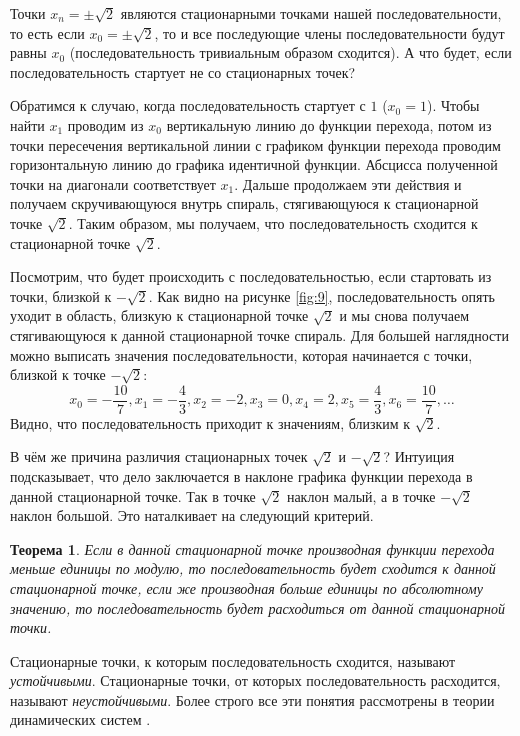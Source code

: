 \documentclass[12pt]{article}
\newtheorem{theorem}{Теорема}[section]
\begin{document}
Точки $x_n = \pm \sqrt{2}$ являются стационарными точками нашей последовательности, то есть если $x_0 = \pm\sqrt{2}$, то и все последующие члены последовательности будут равны $x_0$ (последовательность тривиальным образом сходится). А что будет, если последовательность стартует не со стационарных точек?
\par
Обратимся к случаю, когда последовательность стартует с $1$ ($x_0=1$). Чтобы найти $x_1$ проводим из $x_0$ вертикальную линию до функции перехода, потом из точки пересечения вертикальной линии с графиком функции перехода проводим горизонтальную линию до графика идентичной функции. Абсцисса полученной точки на диагонали соответствует $x_1$. Дальше продолжаем эти действия и получаем скручивающуюся внутрь спираль, стягивающуюся к стационарной точке $\sqrt{2}$. Таким образом, мы получаем, что последовательность сходится к стационарной точке $\sqrt{2}$.
\par
Посмотрим, что будет происходить с последовательностью, если стартовать из точки, близкой к $-\sqrt{2}$. Как видно на рисунке \ref{fig:9}, последовательность опять уходит в область, близкую к стационарной точке $\sqrt{2}$ и мы снова получаем стягивающуюся к данной стационарной точке спираль. Для большей наглядности можно выписать значения последовательности, которая начинается с точки, близкой к точке $-\sqrt{2}$:
\begin{equation}
    x_0 = -\dfrac{10}{7}, x_1 = - \dfrac{4}{3}, x_2 = -2, x_3 = 0, x_4 = 2, x_5 = \dfrac{4}{3}, x_6 = \dfrac{10}{7}, \ldots
\end{equation}
Видно, что последовательность приходит к значениям, близким к $\sqrt{2}$.
\par
В чём же причина различия стационарных точек $\sqrt{2}$ и $-\sqrt{2}$? Интуиция подсказывает, что дело заключается в наклоне графика функции перехода в данной стационарной точке. Так в точке $\sqrt{2}$ наклон малый, а в точке $-\sqrt{2}$ наклон большой. Это наталкивает на следующий критерий.
\begin{theorem}
Если в данной стационарной точке производная \cite{dif} функции перехода меньше единицы по модулю, то последовательность будет сходится к данной стационарной точке, если же производная больше единицы по абсолютному значению, то последовательность будет расходиться от данной стационарной точки.
\end{theorem}
Стационарные точки, к которым последовательность сходится, называют \emph{устойчивыми}. Стационарные точки, от которых последовательность расходится, называют \emph{неустойчивыми}. Более строго все эти понятия рассмотрены в теории динамических систем \cite{bal}.
\end{document}
